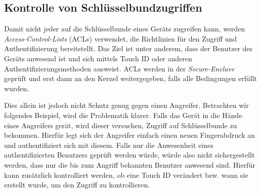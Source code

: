 \subsection{Kontrolle von Schlüsselbundzugriffen}
Damit nicht jeder auf die Schlüsselbunde eines Geräts zugreifen kann, werden
\textit{Access-Control-Lists} (ACLs) verwendet, die Richtlinien für den Zugriff
und Authentifizierung bereitstellt. Das Ziel ist unter anderem, dass der
Benutzer des Geräts anwesend ist und sich mittels Touch ID oder anderen
Authentifizierungsmethoden ausweist. ACLs werden in der \textit{Secure-Enclave}
geprüft und erst dann an den Kernel weitergegeben, falls alle Bedingungen
erfüllt wurden.

Dies allein ist jedoch nicht Schutz genug gegen einen Angreifer. Betrachten wir
folgendes Beispiel, wird die Problematik klarer. Falls das Gerät in die Hände
eines Angreifers gerät, wird dieser versuchen, Zugriff auf Schlüsselbunde zu
bekommen. Hierfür legt sich der Angreifer einfach einen neuen Fingerabdruck an
und authentifiziert sich mit diesem. Falls nur die Anwesenheit eines
authentifizierten Benutzers geprüft werden würde, würde also nicht
sichergestellt werden, dass nur die bis zum Angriff bekannten Benutzer anwesend
sind. Hierfür kann zusätzlich kontrolliert werden, ob eine Touch ID verändert
bzw. wann sie erstellt wurde, um den Zugriff zu kontrollieren.
